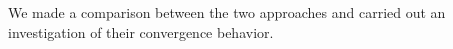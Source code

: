 We made a comparison between the two approaches and carried out an investigation of their convergence behavior.
